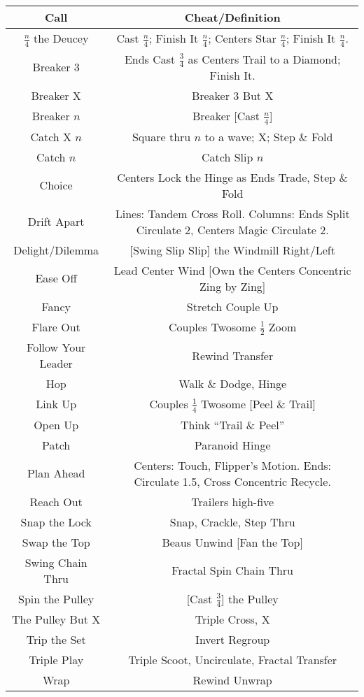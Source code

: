 \documentclass{article}
\begin{document}
\begin{center}
  \begin{tabular}{c | c}
    Call & Cheat/Definition \\ \hline
    $\frac{n}{4}$ the Deucey & Cast $\frac{n}{4}$; Finish It $\frac{n}{4}$; Centers Star $\frac{n}{4}$; Finish It $\frac{n}{4}$. \\
    Breaker 3 & Ends Cast $\frac34$ as Centers Trail to a Diamond; Finish It. \\
    Breaker X & Breaker 3 But X \\
    Breaker $n$ & Breaker [Cast $\frac{n}{4}$] \\
    Catch X $n$ & Square thru $n$ to a wave; X; Step \& Fold \\
    Catch $n$ & Catch Slip $n$ \\
    Choice & Centers Lock the Hinge as Ends Trade, Step \& Fold \\
    Drift Apart & Lines: Tandem Cross Roll.  Columns: Ends Split Circulate 2, Centers Magic Circulate 2. \\
    Delight/Dilemma & [Swing Slip Slip] the Windmill Right/Left \\
    Ease Off & Lead Center Wind [Own the Centers Concentric Zing by Zing] \\
    Fancy & Stretch Couple Up \\
    Flare Out & Couples Twosome $\frac12$ Zoom \\
    Follow Your Leader & Rewind Transfer \\
    Hop & Walk \& Dodge, Hinge \\
    Link Up & Couples $\frac14$ Twosome [Peel \& Trail] \\
    Open Up & Think ``Trail \& Peel'' \\
    Patch & Paranoid Hinge \\
    Plan Ahead & Centers: Touch, Flipper's Motion.  Ends: Circulate 1.5, Cross Concentric Recycle. \\
    Reach Out & Trailers high-five \\
    Snap the Lock & Snap, Crackle, Step Thru \\
    Swap the Top & Beaus Unwind [Fan the Top] \\
    Swing Chain Thru & Fractal Spin Chain Thru \\
    Spin the Pulley & [Cast $\frac34$] the Pulley \\
    The Pulley But X & Triple Cross, X \\
    Trip the Set & Invert Regroup \\
    Triple Play & Triple Scoot, Uncirculate, Fractal Transfer \\
    Wrap & Rewind Unwrap \\
  \end{tabular}
\end{center}
\end{document}
